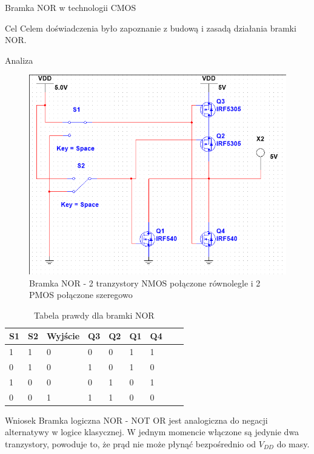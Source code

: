 \documentclass[a4paper]{scrartcl}
\begin{document}
	\clearpage
	\begin{section}{Bramka NOR w technologii CMOS}
		\begin{subsection}{Cel}
			Celem doświadczenia było zapoznanie z budową i zasadą działania bramki NOR.
		\end{subsection}
		\begin{subsection}{Analiza}
				\begin{figure}[ht]
				\begin{center}
					\includegraphics[width=0.8\linewidth]{exercise-10-nor-circuit}
					\caption{Bramka NOR - 2 tranzystory NMOS połączone równolegle i 2 PMOS połączone szeregowo }
					\label{fig:circuit-7-cmos}
				\end{center}
				\end{figure}
				\begin{table}[!ht]
					\begin{center}
					\caption{Tabela prawdy dla bramki NOR}
					\begin{tabular}{| l | l | l | l | l | l | l | l | l |}
						\hline
						S1 & S2 & Wyjście & Q3 & Q2 & Q1 & Q4 \\\hline
						1 & 1 & 0 & 0 & 0 & 1 & 1 \\ \hline
						0 & 1 & 0 & 1 & 0 & 1 & 0 \\ \hline
						1 & 0 & 0 & 0 & 1 & 0 & 1 \\ \hline
						0 & 0 & 1 & 1 & 1 & 0 & 0 \\ \hline
					\end{tabular}
					\end{center}
				\end{table}
		\end{subsection}
		\begin{subsection}{Wniosek}
			Bramka logiczna NOR - NOT OR jest analogiczna do negacji alternatywy w logice klasycznej. W jednym momencie włączone są jedynie dwa tranzystory, powoduje to, że prąd nie może płynąć bezpośrednio od $ V_{DD} $ do masy.
		\end{subsection}
	\end{section}
\end{document}

